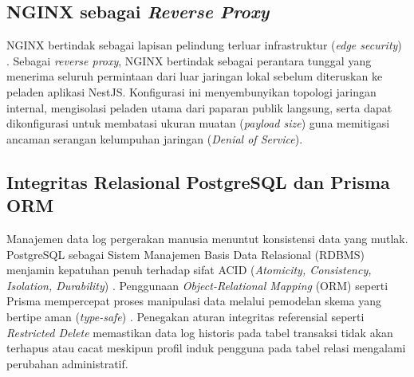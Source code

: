 \subsection{NGINX sebagai \textit{Reverse Proxy}}
NGINX bertindak sebagai lapisan pelindung terluar infrastruktur (\textit{edge security}) \autocite{nginx_docs}. Sebagai \textit{reverse proxy}, NGINX bertindak sebagai perantara tunggal yang menerima seluruh permintaan dari luar jaringan lokal sebelum diteruskan ke peladen aplikasi NestJS. Konfigurasi ini menyembunyikan topologi jaringan internal, mengisolasi peladen utama dari paparan publik langsung, serta dapat dikonfigurasi untuk membatasi ukuran muatan (\textit{payload size}) guna memitigasi ancaman serangan kelumpuhan jaringan (\textit{Denial of Service}).

\subsection{Integritas Relasional PostgreSQL dan Prisma ORM}
Manajemen data log pergerakan manusia menuntut konsistensi data yang mutlak. PostgreSQL sebagai Sistem Manajemen Basis Data Relasional (RDBMS) menjamin kepatuhan penuh terhadap sifat ACID (\textit{Atomicity, Consistency, Isolation, Durability}) \autocite{postgresql_docs}. Penggunaan \textit{Object-Relational Mapping} (ORM) seperti Prisma mempercepat proses manipulasi data melalui pemodelan skema yang bertipe aman (\textit{type-safe}) \autocite{prisma_docs}. Penegakan aturan integritas referensial seperti \textit{Restricted Delete} memastikan data log historis pada tabel transaksi tidak akan terhapus atau cacat meskipun profil induk pengguna pada tabel relasi mengalami perubahan administratif.
